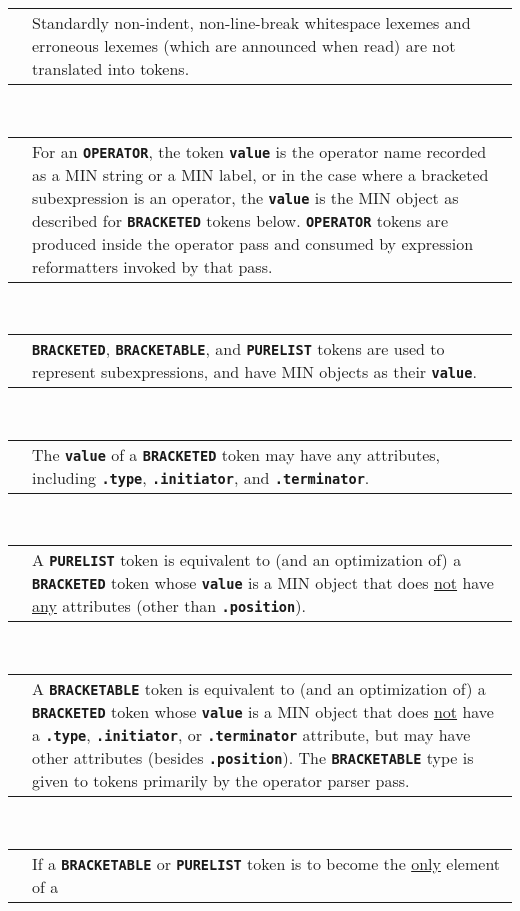 \documentclass[12pt]{article}
\newcommand{\TT}[1]{{\tt \bfseries #1}}
\newenvironment{indpar}[1][0.3in]%
	{\begin{list}{}%
		     {\setlength{\itemsep}{0in}%
		      \setlength{\topsep}{0in}%
		      \setlength{\parsep}{1ex}%
		      \setlength{\labelwidth}{#1}%
		      \setlength{\leftmargin}{#1}%
		      \addtolength{\leftmargin}{\labelsep}}%
	 \item}%
	{\end{list}}
\begin{document}
\begin{indpar}
\begin{tabular}{p{1in}p{4.5in}}
		& Standardly non-indent, non-line-break
		  whitespace lexemes and erroneous lexemes
		  (which are announced when read)
		  are not translated into tokens.
\end{tabular}
\\[1ex]  
\begin{tabular}{p{1in}p{4.5in}}
		& For an \TT{OPERATOR}, the token \TT{value}
		  is the operator name recorded as
		  a MIN string or a MIN label, or in the case
		  where a bracketed subexpression is an operator,
		  the \TT{value} is the MIN object as described
		  for \TT{BRACKETED} tokens below.
		  \TT{OPERATOR} tokens are
		  produced inside the operator pass and consumed by
		  expression reformatters invoked by that pass.
\end{tabular}
\\[1ex]  
\begin{tabular}{p{1in}p{4.5in}}
		& \TT{BRACKETED}, \TT{BRACKETABLE}, and \TT{PURELIST} tokens
		  are used to represent subexpressions, and have
		  MIN objects as their \TT{value}.
\end{tabular}
\\[1ex]  
\begin{tabular}{p{1in}p{4.5in}}
		& The \TT{value} of a \TT{BRACKETED} token may have
		  any attributes, including \TT{.type},
		  \TT{.initiator}, and \TT{.terminator}.
\end{tabular}
\\[1ex]  
\begin{tabular}{p{1in}p{4.5in}}
		& A \TT{PURELIST} token
		  is equivalent to (and an optimization of) a \TT{BRACKETED}
		  token whose \TT{value} is a MIN object
		  that does \underline{not} have \underline{any}
		  attributes (other than \TT{.position}).
\end{tabular}
\\[1ex]  
\begin{tabular}{p{1in}p{4.5in}}
		& A \TT{BRACKETABLE} token
		  is equivalent to (and an optimization of) a \TT{BRACKETED}
		  token whose \TT{value} is a MIN object
		  that does \underline{not} have
		  a \TT{.type}, \TT{.initiator}, or \TT{.terminator}
		  attribute, but may have other attributes
		  (besides \TT{.position}).
		  The \TT{BRACKETABLE} type is given to tokens primarily
		  by the operator parser pass.
\end{tabular}
\\[1ex]  
\begin{tabular}{p{1in}p{4.5in}}
		& If a \TT{BRACKETABLE} or \TT{PURELIST} token
		  is to become the \underline{only} element of a

\end{tabular}
\end{indpar}
\end{document}
